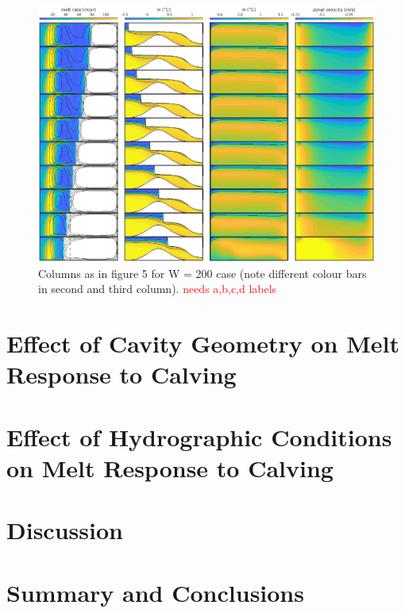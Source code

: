 \documentclass[draft]{agujournal2019}
\newcommand{\red}[1]{\textcolor{red}{#1}}
\begin{document}
\begin{figure}
    \centering
    \includegraphics[width = \textwidth]{../make_figures/plots/figure7.eps}
    \caption{Columns as in figure 5 for W = 200 case (note different colour bars in second and third column). \red{needs a,b,c,d labels}}
    \label{fig:figure7}
\end{figure}



\section{Effect of Cavity Geometry on Melt Response to Calving}

\section{Effect of Hydrographic Conditions on Melt Response to Calving}

\section{Discussion}

\section{Summary and Conclusions}
\end{document}

